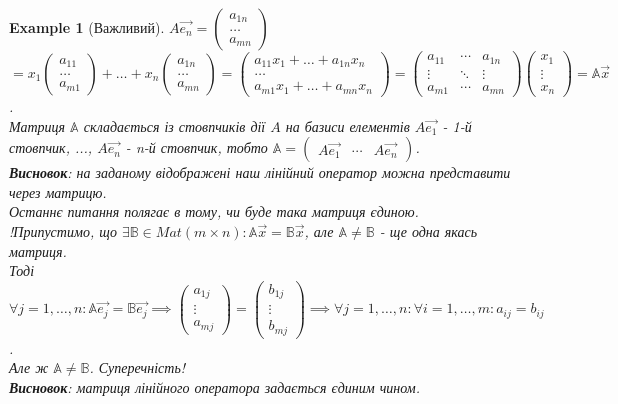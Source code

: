 \documentclass[a4paper, 10pt]{article}
\theoremstyle{theoremdd}
\newtheorem{example}[theorem]{Example}
\begin{document}
\begin{example}[Важливий]
	$A\vec{e_n} = \begin{pmatrix} a_{1n} \\ \dots \\ a_{mn} \end{pmatrix}$\\
$\boxed{=} x_1 \begin{pmatrix} a_{11} \\ \dots \\ a_{m1} \end{pmatrix} + \dots +x_n \begin{pmatrix} a_{1n} \\ \dots \\ a_{mn} \end{pmatrix} = 	
\begin{pmatrix}
	a_{11}x_1 + \dots + a_{1n}x_n \\
	\dots \\
	a_{m1}x_1 + \dots + a_{mn}x_n
	\end{pmatrix} = \begin{pmatrix}
	a_{11} & \cdots &  a_{1n} \\
	\vdots & \ddots & \vdots \\
	a_{m1} & \cdots & a_{mn}
	\end{pmatrix} \begin{pmatrix}
	x_1 \\ \vdots \\ x_n
	\end{pmatrix} = \mathbb{A}\vec{x}$.\\
	Матриця $\mathbb{A}$ складається із стовпчиків дії $A$ на базиси елементів $A\vec{e_1}$ - 1-й стовпчик, ..., $A\vec{e_n}$ - n-й стовпчик, тобто $\mathbb{A} = \begin{pmatrix} A\vec{e_1} & \cdots & A\vec{e_n} \end{pmatrix}$.\\
	\textbf{Висновок}: на заданому відображені наш лінійний оператор можна представити через матрицю.
	\bigskip \\
	Останнє питання полягає в тому, чи буде така матриця єдиною.\\
	!Припустимо, що $\exists \mathbb{B} \in Mat(m \times n): \mathbb{A} \vec{x} = \mathbb{B} \vec{x}$, але $\mathbb{A} \neq \mathbb{B}$ - ще одна якась матриця.\\
	Тоді $\forall j =1,\dots,n: \mathbb{A} \vec{e_j} = \mathbb{B} \vec{e_j} \implies \begin{pmatrix} a_{1j} \\ \vdots \\ a_{mj} \end{pmatrix} = \begin{pmatrix} b_{1j} \\ \vdots \\ b_{mj} \end{pmatrix} \implies \forall j=1,\dots,n: \forall i = 1,\dots,m: a_{ij} = b_{ij}$.\\
	Але ж $\mathbb{A} \neq \mathbb{B}$. Суперечність! \\
	\textbf{Висновок}: матриця лінійного оператора задається єдиним чином.
	\end{example}
	
\end{document}
